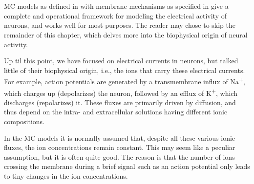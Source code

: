 

\section{}
\label{sec:Neuron:Ions_and_reversals}
MC models as defined in  with membrane mechanisms as specified in  give a complete and operational framework for modeling the electrical activity of neurons, and works well for most purposes. The reader may chose to skip the remainder of this chapter, which delves more into the biophysical origin of neural activity. 

Up til this point, we have focused on electrical currents in neurons, but talked little of their biophysical origin, i.e., the ions that carry these electrical currents. For example, action potentials are generated by a transmembrane influx of Na\textsuperscript{+}, which charges up (depolarizes) the neuron, followed by an efflux of K\textsuperscript{+}, which discharges (repolarizes) it. These fluxes are primarily driven by diffusion, and thus depend on the intra- and extracellular solutions having different ionic compositions. 

In the MC models it is normally assumed that, despite all these various ionic fluxes, the ion concentrations remain constant. This may seem like a peculiar assumption, but it is often quite good. The reason is that the number of ions crossing the membrane during a brief signal such as an action potential only leads to tiny changes in the ion concentrations. 

